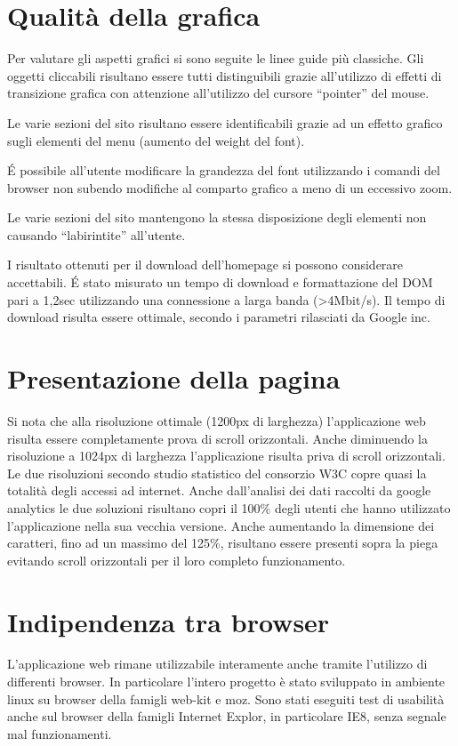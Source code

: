 \documentclass[a4paper,12pt,hidelinks]{report}
\begin{document}
\section*{Qualità della grafica}
Per valutare gli aspetti grafici si sono seguite le linee guide più classiche.
Gli oggetti cliccabili risultano essere tutti distinguibili grazie all'utilizzo di effetti di transizione grafica con attenzione all'utilizzo del cursore ``pointer'' del mouse.
\par Le varie sezioni del sito risultano essere identificabili grazie ad un effetto grafico sugli elementi del menu (aumento del weight del font).
\par \'E possibile all'utente modificare la grandezza del font utilizzando i comandi del browser non subendo modifiche al comparto grafico a meno di un eccessivo zoom.
\par Le varie sezioni del sito mantengono la stessa disposizione degli elementi non causando ``labirintite'' all'utente.
\par I risultato ottenuti per il download dell'homepage si possono considerare accettabili. \'E stato misurato un tempo di download e formattazione del DOM pari a 1,2sec utilizzando
una connessione a larga banda (>4Mbit/s). Il tempo di download risulta essere ottimale, secondo i parametri rilasciati da Google inc.

\section*{Presentazione della pagina}
Si nota che alla risoluzione ottimale (1200px di larghezza) l'applicazione web risulta essere completamente prova di scroll orizzontali.
Anche diminuendo la risoluzione a 1024px di larghezza l'applicazione risulta priva di scroll orizzontali. Le due risoluzioni secondo studio statistico del consorzio W3C 
copre quasi la totalità degli accessi ad internet. Anche dall'analisi dei dati raccolti da google analytics le due soluzioni risultano copri il 100\% degli utenti che hanno
utilizzato l'applicazione nella sua vecchia versione.
Anche aumentando la dimensione dei caratteri, fino ad un massimo del 125\%, risultano essere presenti sopra la piega evitando scroll orizzontali per il loro completo funzionamento.
\newpage
\section*{Indipendenza tra browser}
L'applicazione web rimane utilizzabile interamente anche tramite l'utilizzo di differenti browser. In particolare l'intero progetto è stato sviluppato in ambiente linux su browser
della famigli web-kit e moz. Sono stati eseguiti test di usabilità anche sul browser della famigli Internet Explor, in particolare IE8, senza segnale mal funzionamenti.
\end{document}

